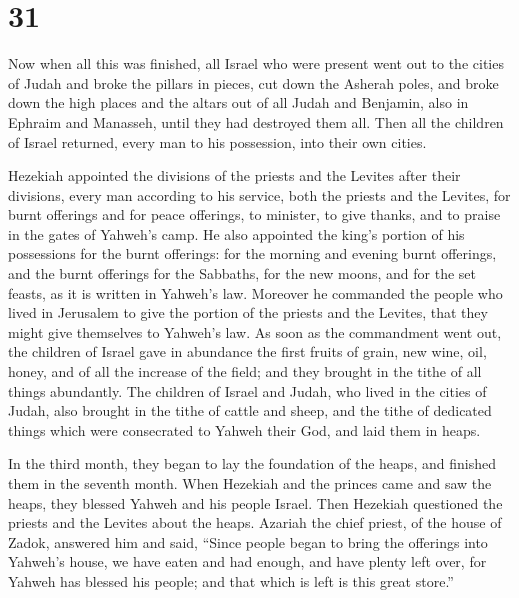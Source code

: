 \hypertarget{section-30}{%
\section{31}\label{section-30}}

 Now when all this was finished, all Israel who were present
went out to the cities of Judah and broke the pillars in pieces, cut
down the Asherah poles, and broke down the high places and the altars
out of all Judah and Benjamin, also in Ephraim and Manasseh, until they
had destroyed them all. Then all the children of Israel returned, every
man to his possession, into their own cities.

 Hezekiah appointed the divisions of the priests and the
Levites after their divisions, every man according to his service, both
the priests and the Levites, for burnt offerings and for peace
offerings, to minister, to give thanks, and to praise in the gates of
Yahweh's camp.  He also appointed the king's portion of his
possessions for the burnt offerings: for the morning and evening burnt
offerings, and the burnt offerings for the Sabbaths, for the new moons,
and for the set feasts, as it is written in Yahweh's law. 
Moreover he commanded the people who lived in Jerusalem to give the
portion of the priests and the Levites, that they might give themselves
to Yahweh's law.  As soon as the commandment went out, the
children of Israel gave in abundance the first fruits of grain, new
wine, oil, honey, and of all the increase of the field; and they brought
in the tithe of all things abundantly.  The children of
Israel and Judah, who lived in the cities of Judah, also brought in the
tithe of cattle and sheep, and the tithe of dedicated things which were
consecrated to Yahweh their God, and laid them in heaps.

 In the third month, they began to lay the foundation of the
heaps, and finished them in the seventh month.  When
Hezekiah and the princes came and saw the heaps, they blessed Yahweh and
his people Israel.  Then Hezekiah questioned the priests and
the Levites about the heaps.  Azariah the chief priest, of
the house of Zadok, answered him and said, ``Since people began to bring
the offerings into Yahweh's house, we have eaten and had enough, and
have plenty left over, for Yahweh has blessed his people; and that which
is left is this great store.''

